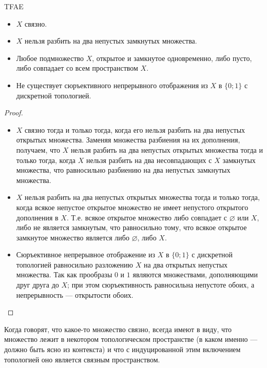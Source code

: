 \documentclass[12pt,a4paper]{article}
\begin{document}
    \begin{theorem}
        TFAE
        \begin{itemize}
            \item $X$ связно.
            \item $X$ нельзя разбить на два непустых замкнутых множества.
            \item Любое подмножество $X$, открытое и замкнутое одновременно, либо пусто, либо совпадает со всем пространством $X$.
            \item Не существует сюръективного непрерывного отображения из $X$ в $\{0; 1\}$ с дискретной топологией.
        \end{itemize}
    \end{theorem}

    \begin{proof}
        \begin{itemize}
            \item $X$ связно тогда и только тогда, когда его нельзя разбить на два непустых открытых множества. Заменяя множества разбиения на их дополнения, получаем, что $X$ нельзя разбить на два непустых открытых множества тогда и только тогда, когда $X$ нельзя разбить на два несовпадающих с $X$ замкнутых множества, что равносильно разбиению на два непустых замкнутых множества.

            \item $X$ нельзя разбить на два непустых открытых множества тогда и только тогда, когда всякое непустое открытое множество не имеет непустого открытого дополнения в $X$. Т.е. всякое открытое множество либо совпадает с $\varnothing$ или $X$, либо не является замкнутым, что равносильно тому, что всякое открытое замкнутое множество является либо $\varnothing$, либо $X$.

            \item Сюръективное непрерывное отображение из $X$ в $\{0; 1\}$ с дискретной топологией равносильно разложению $X$ на два открытых непустых множества. Так как прообразы $0$ и $1$ являются множествами, дополняющими друг друга до $X$; при этом сюръективность равносильна непустоте обоих, а непрерывность --- открытости обоих.
        \end{itemize}
    \end{proof}

    \begin{remark*}
        Когда говорят, что какое-то множество связно, всегда имеют в виду, что множество лежит в некотором топологическом пространстве (в каком именно --- должно быть ясно из контекста) и что с индуцированной этим включением топологией оно является связным пространством.
    \end{remark*}
\end{document}
